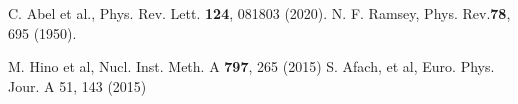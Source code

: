\documentclass[onecolumn]{preport}
\begin{document}
\begin{comment}

質問
・abstで述べていた、先行研究よりも小さいとかの話題は入れるべき？


S. Afach et al, Euro Phys J. A \textbf{51}, 143 (2015)

\section*{方針}




・１章分増やして、KUR, JPARC分ける
・イントロが長いので短くする
・

まず目次を作る
section subsection を先に埋めてしまう
セクションの初めにメインの内容を書く「この章ではこのようなことを説明します」
cloudlatex
絵を先に入れる
次のミーティングまで
・VSM X線(膜の準備に含む)
・偏極度測定
・反射率

google scholar ""で囲って用例を調べてみる
論文の書き方を見てみる
樋口さんが送ってくれたもの


本稿はレポートのテンプレートである．

まずはじめに参考文献を引用する\cite{Knuth86}．

さらにもうひとつ引用する\cite{BollenHHJ07}．

日本語の文献も引用する\cite{Okumura07}．

最後にウェブページを引用する\cite{Github}．

\section*{表や図の描画方法}

図は\figref{sample}，表は\tabref{sample}として参照する．


\begin{table}[tbh]
 \centering
 \begin{tabular}{|l|r|} \hline
 A1 & B1 \\
 A2 & B2 \\ \hline
 \end{tabular}
 \caption{図の参考例}
 \tablab{sample}
\end{table}

\section{おわりに}

本稿において本文を通してレポートの執筆が可能な環境であることが示された．
\end{comment}


\begin{thebibliography}{99}
    C. Abel et al., Phys. Rev. Lett. \textbf{124}, 081803 (2020). 
   N. F. Ramsey, Phys. Rev.\textbf{78}, 695 (1950).
 
   M. Hino et al, Nucl. Inst. Meth. A \textbf{797}, 265 (2015)
  S. Afach, et al, Euro. Phys. Jour. A 51, 143 (2015) 
  
\end{thebibliography}
\end{document}
